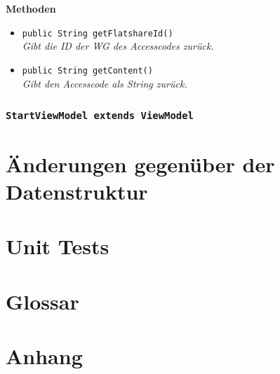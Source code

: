 \documentclass[a4paper]{scrreprt}
\begin{document}
	\textbf{Methoden}
	\begin{itemize}
		\item{\texttt{public String getFlatshareId()}}\\
		\textit{Gibt die ID der WG des Accesscodes zurück.}\\
		\item{\texttt{public String getContent()}}\\
		\textit{Gibt den Accesscode als String zurück.}\\
	\end{itemize}
	
		\subsection{\texttt{StartViewModel extends ViewModel}}
		
		
	
		
		\chapter{Änderungen gegenüber der Datenstruktur}
		
		\chapter{Unit Tests}
		
		
		\chapter{Glossar}
		
		\chapter{Anhang}
\end{document}

